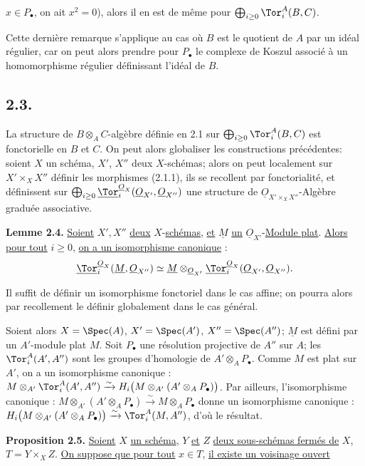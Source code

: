 
\(x\in P_\bullet\), on ait \(x^2=0\)), alors il en est de même pour \(\bigoplus_{i\ge0}\Tor_i^A(B,C)\).

Cette dernière remarque s'applique au cas où \(B\) est le quotient de \(A\) par un idéal régulier, car on peut alors prendre pour \(P_\bullet\) le complexe de Koszul associé à un homomorphisme régulier définissant l'idéal de \(B\).

\subsection*{2.3.}
La structure de \(B\otimes_A C\)-algèbre définie en 2.1 sur \(\bigoplus_{i\ge0}\Tor_i^A(B,C)\) est fonctorielle en \(B\) et \(C\). On peut alors globaliser les constructions précédentes: soient \(X\) un schéma, \(X'\), \(X''\) deux \(X\)-schémas; alors on peut localement sur \(X'\times_X X''\) définir les morphismes (2.1.1), ils se recollent par fonctorialité, et définissent sur \(\bigoplus_{i\ge0}\underline{\Tor}_i^{\underline{O}_X}(\underline{O}_{X'},\underline{O}_{X''})\) une structure de \(\underline{O}_{X'\times_X X''}\)-Algèbre graduée associative.

\textbf{Lemme 2.4.} \uline{Soient} \(X',X''\) \uline{deux} \(X\)-\uline{schémas}, \uline{et} \(\underline{M}\) \uline{un} \(\underline{O}_{X'}\)-\uline{Module plat}. \uline{Alors pour tout} \(i\ge0\), \uline{on a un isomorphisme canonique} :
\begin{equation}\notag
\underline{\Tor}_i^{\underline{O}_X}(\underline{M},\underline{O}_{X''})\simeq
\underline{M}\otimes_{\underline{O}_{X'}}\underline{\Tor}_i^{\underline{O}_X}(\underline{O}_{X'},\underline{O}_{X''}).
\end{equation}

Il suffit de définir un isomorphisme fonctoriel dans le cas affine; on pourra alors par recollement le définir globalement dans le cas général.

Soient alors \(X=\Spec(A)\), \(X'=\Spec(A')\), \(X''=\Spec(A'')\); \(\underline{M}\) est défini par un \(A'\)-module plat \(M\). Soit \(P_\bullet\) une résolution projective de \(A''\) sur \(A\); les \(\Tor_i^A(A',A'')\) sont les groupes d'homologie de \(A'\otimes_A P_\bullet\). Comme \(M\) est plat sur \(A'\), on a un isomorphisme canonique : \(M\otimes_{A'}\Tor_i^A(A',A'')\xrightarrow{\sim}H_i\bigl(M\otimes_{A'}(A'\otimes_A P_\bullet)\bigr)\). Par ailleurs, l'isomorphisme canonique : \(M\otimes_{A'}(A'\otimes_A P_\bullet)\xrightarrow{\sim}M\otimes_A P_\bullet\) donne un isomorphisme canonique : \(H_i\bigl(M\otimes_{A'}(A'\otimes_A P_\bullet)\bigr)\xrightarrow{\sim}\Tor_i^A(M,A'')\), d'où le résultat.

\textbf{Proposition 2.5.} \uline{Soient} \(X\) \uline{un schéma}, \(Y\) \uline{et} \(Z\) \uline{deux sous-schémas fermés de} \(X\), \(T=Y\times_X Z\). \uline{On suppose que pour tout} \(x\in T\), \uline{il existe un voisinage ouvert}
